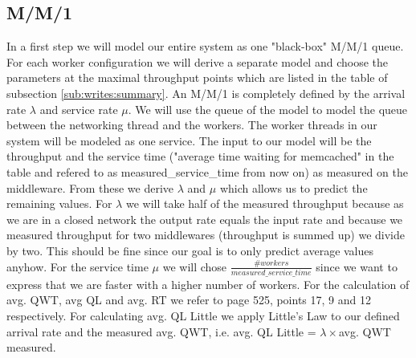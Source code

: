 \documentclass[11pt,a4paper]{article}
\begin{document}
\subsection{M/M/1}
In a first step we will model our entire system as one "black-box" M/M/1 queue. For each worker configuration we will derive a separate model and choose the parameters at the maximal throughput points which are listed in the table of subsection \ref{sub:writes:summary}. An M/M/1 is completely defined by the arrival rate $\lambda$ and service rate $\mu$. We will use the queue of the model to model the queue between the networking thread and the workers. The worker threads in our system will be modeled as one service. The input to our model will be the throughput and the service time ("average time waiting for memcached" in the table and refered to as measured\_service\_time from now on) as measured on the middleware. From these we derive $\lambda$ and $\mu$ which allows us to predict the remaining values. For $\lambda$ we will take half of the measured throughput because as we are in a closed network the output rate equals the input rate and because we measured throughput for two middlewares (throughput is summed up) we divide by two. This should be fine since our goal is to only predict average values anyhow. For the service time $\mu$ we will chose $\frac{\#workers}{measured\_service\_ time}$ since we want to express that we are faster with a higher number of workers. For the calculation of avg. QWT, avg QL and avg. RT we refer to \cite{performance_book} page 525, points 17, 9 and 12 respectively. For calculating avg. QL Little we apply Little's Law to our defined arrival rate and the measured avg. QWT, i.e. avg. QL Little = $\lambda \times$avg. QWT measured.
\end{document}
